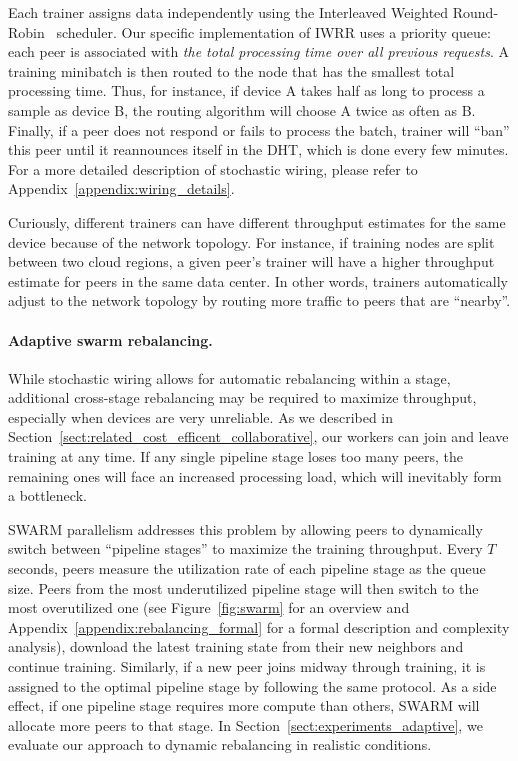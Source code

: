 Each trainer assigns data independently using the Interleaved Weighted Round-Robin~\citep{iwrr,interleaved_round_robin} scheduler. Our specific implementation of IWRR uses a priority queue: each peer is associated with \textit{the total processing time over all previous requests}. A training minibatch is then routed to the node that has the smallest total processing time. Thus, for instance, if device A takes half as long to process a sample as device B, the routing algorithm will choose A twice as often as B. Finally, if a peer does not respond or fails to process the batch, trainer will ``ban'' this peer until it reannounces itself in the DHT, which is done every few minutes. For a more detailed description of stochastic wiring, please refer to Appendix~\ref{appendix:wiring_details}.

Curiously, different trainers can have different throughput estimates for the same device because of the network topology. For instance, if training nodes are split between two cloud regions, a given peer's trainer will have a higher throughput estimate for peers in the same data center. In other words, trainers automatically adjust to the network topology by routing more traffic to peers that are ``nearby''.

\vspace{-8pt}
\paragraph{Adaptive swarm rebalancing.} While stochastic wiring allows for automatic rebalancing within a stage, additional cross-stage rebalancing may be required to maximize throughput, especially when devices are very unreliable. As we described in Section~\ref{sect:related_cost_efficent_collaborative}, our workers can join and leave training at any time. If any single pipeline stage loses too many peers, the remaining ones will face an increased processing load, which will inevitably form a bottleneck. 

SWARM parallelism addresses this problem by allowing peers to dynamically switch between ``pipeline stages'' to maximize the training throughput. Every $T$ seconds, peers measure the utilization rate of each pipeline stage as the queue size.
Peers from the most underutilized pipeline stage will then switch to the most overutilized one (see Figure~\ref{fig:swarm} for an overview and Appendix~\ref{appendix:rebalancing_formal} for a formal description and complexity analysis), download the latest training state from their new neighbors and continue training. Similarly, if a new peer joins midway through training, it is assigned to the optimal pipeline stage by following the same protocol. As a side effect, if one pipeline stage requires more compute than others, SWARM will allocate more peers to that stage. In Section~\ref{sect:experiments_adaptive}, we evaluate our approach to dynamic rebalancing in realistic conditions.










